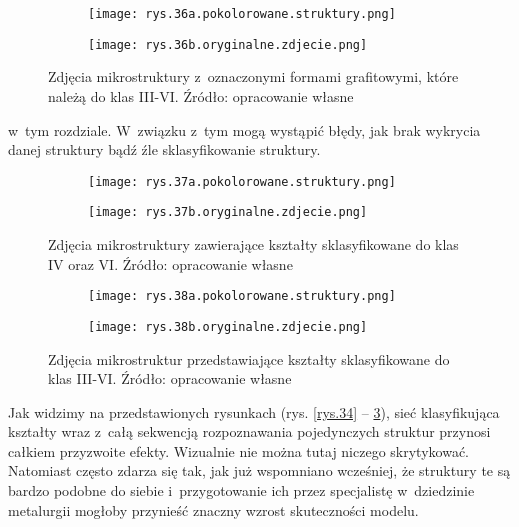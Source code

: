\begin{figure}[h]
	\centering
	\begin{subfigure}{0.4\textwidth}
	    \centering
	    \texttt{[image: rys.36a.pokolorowane.struktury.png]}
	\end{subfigure}
	\begin{subfigure}{0.4\textwidth}
	    \centering
	    \texttt{[image: rys.36b.oryginalne.zdjecie.png]}
	\end{subfigure}
	\caption{\label{rys.36}Zdjęcia mikrostruktury z~oznaczonymi formami grafitowymi, które należą do klas III-VI. Źródło: opracowanie własne}
\end{figure}
w~tym rozdziale. W~związku z~tym mogą wystąpić błędy, jak brak wykrycia danej struktury bądź źle sklasyfikowanie struktury.
\begin{figure}[h]
	\centering
	\begin{subfigure}{0.4\textwidth}
	    \centering
	    \texttt{[image: rys.37a.pokolorowane.struktury.png]}
	\end{subfigure}
	\begin{subfigure}{0.4\textwidth}
	    \centering
	    \texttt{[image: rys.37b.oryginalne.zdjecie.png]}
	\end{subfigure}
	\caption{\label{rys.37}Zdjęcia mikrostruktury zawierające kształty sklasyfikowane do klas IV oraz VI. Źródło: opracowanie własne}
\end{figure}
\begin{figure}[!h]
	\centering
	\begin{subfigure}{0.4\textwidth}
	    \centering
	    \texttt{[image: rys.38a.pokolorowane.struktury.png]}
	\end{subfigure}
	\begin{subfigure}{0.4\textwidth}
	    \centering
	    \texttt{[image: rys.38b.oryginalne.zdjecie.png]}
	\end{subfigure}
	\caption{\label{rys.38}Zdjęcia mikrostruktur przedstawiające kształty sklasyfikowane do klas III-VI. Źródło: opracowanie własne}
\end{figure}
Jak widzimy na przedstawionych rysunkach (rys. \ref{rys.34} – \ref{rys.38}), sieć klasyfikująca kształty wraz z~całą sekwencją rozpoznawania pojedynczych struktur przynosi całkiem przyzwoite efekty. Wizualnie nie można tutaj niczego skrytykować. Natomiast często zdarza się tak, jak już wspomniano wcześniej, że struktury te są bardzo podobne do siebie i~przygotowanie ich przez specjalistę w~dziedzinie metalurgii mogłoby przynieść znaczny wzrost skuteczności modelu.


